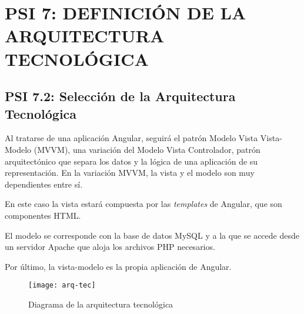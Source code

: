 % 
%
%
%


% 


\newpage

\section{PSI 7: DEFINICIÓN DE LA ARQUITECTURA TECNOLÓGICA}


\subsection{PSI 7.2: Selección de la Arquitectura Tecnológica} 
Al tratarse de una aplicación Angular, seguirá el patrón Modelo Vista Vista-Modelo (MVVM), una variación del Modelo Vista Controlador, patrón arquitectónico que separa los datos y la lógica de una aplicación de su representación. En la variación MVVM, la vista y el modelo son muy dependientes entre sí. \par 
En este caso la vista estará compuesta por las \textit{templates} de Angular, que son componentes HTML.\par
El modelo se corresponde con la base de datos MySQL y a la que se accede desde un servidor Apache que aloja los archivos PHP necesarios.\par
Por último, la vista-modelo es la propia aplicación de Angular.
\begin{figure}[H]
\centering
\centerline{\texttt{[image: arq-tec]}}
\caption{Diagrama de la arquitectura tecnológica}
\end{figure}